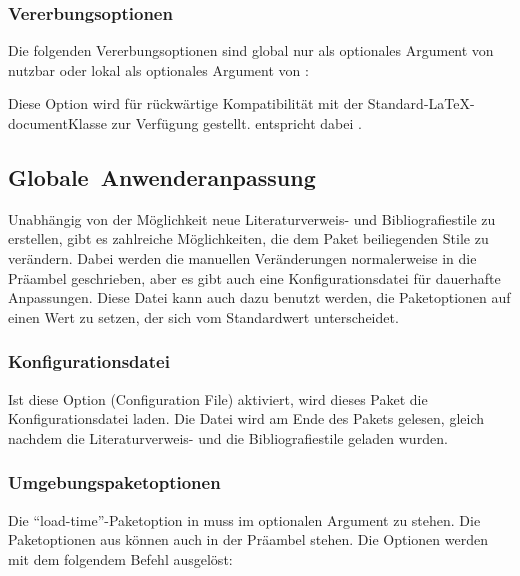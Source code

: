 \documentclass{ltxdockit}[2011/03/25]
\begin{document}
\subsubsection{Vererbungsoptionen} 

Die folgenden Vererbungsoptionen sind global nur als optionales Argument von 
 nutzbar oder lokal als optionales Argument von :

\begin{optionlist}

\DeprecatedMark  
Diese Option wird für rückwärtige Kompatibilität mit der
Standard-\LaTeX-document\-Klasse zur Verfügung gestellt.  entspricht
dabei .

\end{optionlist}

\subsection{Globale~Anwenderanpas\-sung} \label{use:cfg} 

Unabhängig von der Möglichkeit neue Literaturverweis- und
Bibliografiestile zu erstellen, gibt es zahlreiche Möglichkeiten, die dem Paket
beiliegenden Stile zu verändern. Dabei werden die manuellen Veränderungen
normalerweise in die Präambel geschrieben, aber es gibt auch eine
Konfigurationsdatei für dauerhafte Anpassungen. Diese Datei kann auch dazu
benutzt werden, die Paketoptionen auf einen Wert zu setzen, der sich vom
Standardwert unterscheidet.

\subsubsection{Konfigurationsdatei} \label{use:cfg:cfg} 

Ist diese Option (Configuration File)
aktiviert, wird dieses Paket die Konfigurationsdatei 
laden. Die Datei wird am Ende des Pakets gelesen, gleich nachdem die
Literaturverweis- und die Bibliografiestile geladen wurden.

\subsubsection{Umgebungspaketoptionen} \label{use:cfg:opt} 

Die "`load-time"'-Paketoption in  muss im optionalen Argument zu
 stehen. Die Paketoptionen aus  können auch
in der Präambel stehen. Die Optionen werden mit dem folgendem Befehl ausgelöst:
\end{document}
